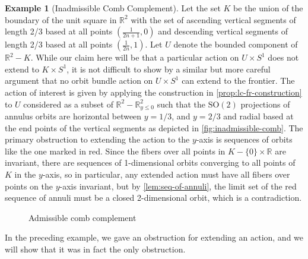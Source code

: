 \documentclass[10pt, oneside]{article}
\newcommand{\R}{\mathbb{R}}
\newcommand{\SO}[1][2]{\text{SO}(#1)}
\theoremstyle{definition}
\newtheorem{eg}{Example}[section]
\theoremstyle{definition}
\begin{document}
\begin{eg}[Inadmissible Comb Complement]
    Let the set $K$ be the union of the boundary of the unit square in $\R^2$ with the set of ascending vertical segments of length 2/3 based at all points $(\frac{1}{2n+1}, 0)$ and descending vertical segments of length 2/3 based at all points $(\frac{1}{2n}, 1)$. Let $U$ denote the bounded component of $\R^2 - K$. While our claim here will be that a particular action on $U\times S^1$ does not extend to $K\times S^1$, it is not difficult to show by a similar but more careful argument that no orbit bundle action on $U\times S^1$ can extend to the frontier. The action of interest is given by applying the construction in \cref{prop:lc-fr-construction} to $U$ considered as a subset of $\R^2 - \R^2_{y\leq 0}$ such that the $\SO$ projections of annulus orbits are horizontal between $y=1/3$, and $y=2/3$ and radial based at the end points of the vertical segments as depicted in \cref{fig:inadmissible-comb}. The primary obstruction to extending the action to the $y$-axis is sequences of orbits like the one marked in red. Since the fibers over all points in $K-\{0\}\times\R$ are invariant, there are sequences of 1-dimensional orbits converging to all points of $K$ in the $y$-axis, so in particular, any extended action must have all fibers over points on the $y$-axis invariant, but by \cref{lem:seq-of-annuli}, the limit set of the red sequence of annuli must be a closed 2-dimensional orbit, which is a contradiction. 
\end{eg}

\begin{figure}
\centering
\begin{minipage}{.5\textwidth}
  \centering
  
  \caption{Inadmissible comb complement}
  \label{fig:inadmissible-comb}
\end{minipage}%
\begin{minipage}{.5\textwidth}
  \centering
  
  \caption{Admissible comb complement}
  \label{fig:admissible-comb}
\end{minipage}
\end{figure}

In the preceding example, we gave an obstruction for extending an action, and we will show that it was in fact the only obstruction.
\end{document}
